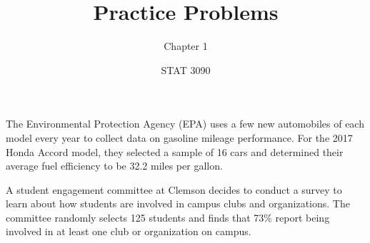 \documentclass[noanswers]{exam}
\title{Practice Problems}
\author{Chapter 1}
\date{STAT 3090}
\begin{document}

\begin{questions} 

	\question The Environmental Protection Agency (EPA) uses a few new automobiles of each model every year to collect data on gasoline mileage performance. For the 2017 Honda Accord model, they selected a sample of 16 cars and determined their average fuel efficiency to be 32.2 miles per gallon.
	
	\vspace{3mm}


	\question A student engagement committee at Clemson decides to conduct a survey to learn about how students are involved in campus clubs and organizations. The committee randomly selects 125 students and finds that 73\% report being involved in at least one club or organization on campus.


\end{questions}
\end{document}
